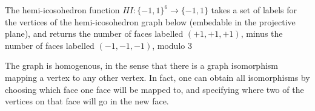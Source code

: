 \begin{example}
    The hemi-icosohedron function $HI: \{ -1, 1 \}^6 \to \{ -1, 1 \}$ takes a set of labels for the vertices of the hemi-icosohedron graph below (embedable in the projective plane), and returns the number of faces labelled $(+1,+1,+1)$, minus the number of faces labelled $(-1,-1,-1)$, modulo 3
\begin{center}
\end{center}
    The graph is homogenous, in the sense that there is a graph isomorphism mapping a vertex to any other vertex. In fact, one can obtain all isomorphisms by choosing which face one face will be mapped to, and specifying where two of the vertices on that face will go in the new face.


\end{example}
